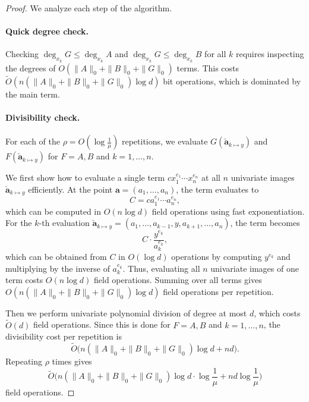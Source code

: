 \documentclass{article}
\numberwithin{equation}{section}
\begin{document}
\begin{proof}
We analyze each step of the algorithm.

\paragraph{Quick degree check.}
Checking $\deg_{x_k} G \le \deg_{x_k} A$ and $\deg_{x_k} G \le \deg_{x_k} B$ for all $k$ requires inspecting the degrees of $O(\|A\|_0 + \|B\|_0 + \|G\|_0)$ terms. This costs $\widetilde{O}(n(\|A\|_0 + \|B\|_0 + \|G\|_0)\log d)$ bit operations, which is dominated by the main term.

\paragraph{Divisibility check.}
For each of the $\rho = O(\log\frac{1}{\mu})$ repetitions, we evaluate $G(\mathbf{\check{a}}_{k \mapsto y})$ and $F(\mathbf{\check{a}}_{k \mapsto y})$ for $F = A, B$ and $k = 1,\dots,n$.

We first show how to evaluate a single term $c x_1^{e_1}\cdots x_n^{e_n}$ at all $n$ univariate images $\mathbf{\check{a}}_{k \mapsto y}$ efficiently. At the point $\mathbf{a} = (a_1,\dots,a_n)$, the term evaluates to
\[
C = c a_1^{e_1}\cdots a_n^{e_n},
\]
which can be computed in $O(n \log d)$ field operations using fast exponentiation. For the $k$-th evaluation $\mathbf{\check{a}}_{k \mapsto y} = (a_1,\dots,a_{k-1}, y, a_{k+1},\dots,a_n)$, the term becomes
\[
C \cdot \frac{y^{e_k}}{a_k^{e_k}},
\]
which can be obtained from $C$ in $O(\log d)$ operations by computing $y^{e_k}$ and multiplying by the inverse of $a_k^{e_k}$. Thus, evaluating all $n$ univariate images of one term costs $O(n \log d)$ field operations. Summing over all terms gives $O(n(\|A\|_0 + \|B\|_0 + \|G\|_0) \log d)$ field operations per repetition.

Then we perform univariate polynomial division of degree at most $d$, which costs $\widetilde{O}(d)$ field operations. Since this is done for $F = A, B$ and $k = 1,\dots,n$, the divisibility cost per repetition is
\[
\widetilde{O}\bigl( n (\|A\|_0 + \|B\|_0 + \|G\|_0) \log d + n d \bigr).
\]
Repeating $\rho$ times gives
\[
\widetilde{O}\bigl( n (\|A\|_0 + \|B\|_0 + \|G\|_0) \log d \cdot \log\frac{1}{\mu} + n d \log\frac{1}{\mu} \bigr)
\]
field operations.



\end{proof}
\end{document}

